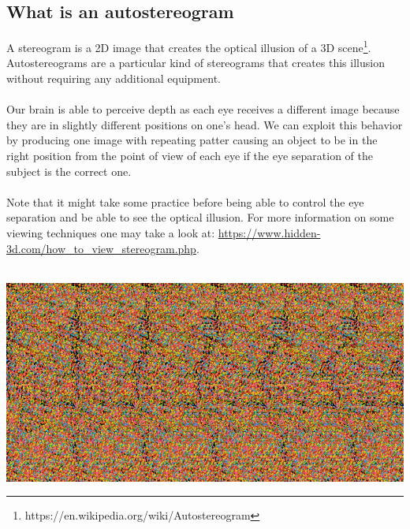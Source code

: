 \documentclass[12pt, a4paper]{article}
\begin{document}
\subsection{What is an autostereogram}
A stereogram is a 2D image that creates the optical illusion of a 3D scene\footnote{https://en.wikipedia.org/wiki/Autostereogram}.
Autostereograms are a particular kind of stereograms
that creates this illusion without requiring any additional equipment.\\\\
Our brain is able to perceive depth as each eye receives a different image because they are in slightly different positions on one's head.
We can exploit this behavior by producing one image with repeating patter causing an object to be in the right position from the point of view of each eye
if the eye separation of the subject is the correct one.\\\\
Note that it might take some practice before being able to control the eye separation and be able to see
the optical illusion. For more information on some viewing techniques one may take a look at: \url{https://www.hidden-3d.com/how_to_view_stereogram.php}.\\\\
\begin{center}
    \centering
    \includegraphics[width=1.0\textwidth]{img/shark.png}
\end{center}
\clearpage
\end{document}
